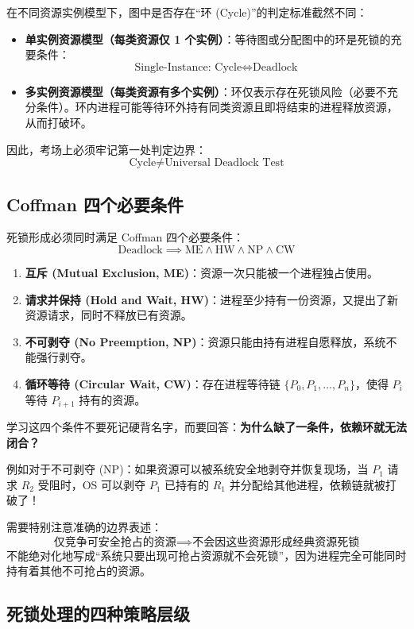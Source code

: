 \documentclass[11pt,a4paper]{ctexart}
\newcommand{\kw}[1]{\textbf{#1}}
\begin{document}
在不同资源实例模型下，图中是否存在“环 (Cycle)”的判定标准截然不同：

\begin{itemize}
\item \kw{单实例资源模型（每类资源仅 1 个实例）}：等待图或分配图中的环是死锁的充要条件：
\[
\boxed{\text{Single-Instance: } \text{Cycle} \iff \text{Deadlock}}
\]
\item \kw{多实例资源模型（每类资源有多个实例）}：环仅表示存在死锁风险（必要不充分条件）。环内进程可能等待环外持有同类资源且即将结束的进程释放资源，从而打破环。
\end{itemize}

因此，考场上必须牢记第一处判定边界：
\[
\boxed{\text{Cycle} \neq \text{Universal Deadlock Test}}
\]

\subsection{Coffman 四个必要条件}

死锁形成必须同时满足 Coffman 四个必要条件：
\[
\boxed{\text{Deadlock} \implies \text{ME} \land \text{HW} \land \text{NP} \land \text{CW}}
\]

\begin{enumerate}
\item \kw{互斥 (Mutual Exclusion, ME)}：资源一次只能被一个进程独占使用。
\item \kw{请求并保持 (Hold and Wait, HW)}：进程至少持有一份资源，又提出了新资源请求，同时不释放已有资源。
\item \kw{不可剥夺 (No Preemption, NP)}：资源只能由持有进程自愿释放，系统不能强行剥夺。
\item \kw{循环等待 (Circular Wait, CW)}：存在进程等待链 $\{P_0, P_1, \dots, P_n\}$，使得 $P_i$ 等待 $P_{i+1}$ 持有的资源。
\end{enumerate}

学习这四个条件不要死记硬背名字，而要回答：\kw{为什么缺了一条件，依赖环就无法闭合？}

例如对于不可剥夺 (NP)：如果资源可以被系统安全地剥夺并恢复现场，当 $P_1$ 请求 $R_2$ 受阻时，OS 可以剥夺 $P_1$ 已持有的 $R_1$ 并分配给其他进程，依赖链就被打破了！

需要特别注意准确的边界表述：
\[
\boxed{\text{仅竞争可安全抢占的资源} \implies \text{不会因这些资源形成经典资源死锁}}
\]
不能绝对化地写成“系统只要出现可抢占资源就不会死锁”，因为进程完全可能同时持有着其他不可抢占的资源。

\subsection{死锁处理的四种策略层级}
\end{document}

